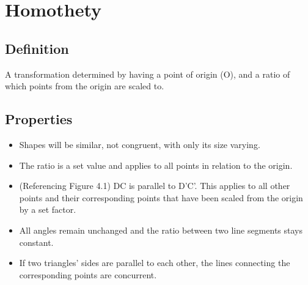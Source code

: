 \documentclass{article}
\begin{document}
\section{Homothety}
\begin{minipage}{.6\linewidth}
    \subsection{Definition}
    A transformation determined by having a point of origin (O), and a ratio of which points from the origin are scaled to.
    \subsection{Properties}
    \begin{itemize}
        \item Shapes will be similar, not congruent, with only its size varying.
        \item The ratio is a set value and applies to all points in relation to the origin.
        \item (Referencing Figure 4.1) DC is parallel to D’C’. This applies to all other points and their corresponding points that have been scaled from the origin by a set factor.
        \item All angles remain unchanged and the ratio between two line segments stays constant.
        \item If two triangles' sides are parallel to each other, the lines connecting the corresponding points are concurrent.

    \end{itemize}
\end{minipage}
\hfill
\end{document}
